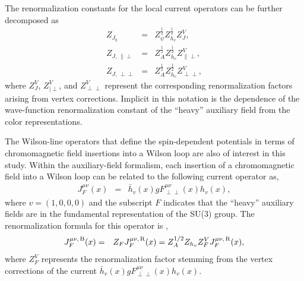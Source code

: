 The renormalization constants for the local current operators can be further decomposed as
\begin{eqnarray}
Z_{J_q} &=& Z_{\psi}^{\frac{1}{2}} Z_{h_v}^{\frac{1}{2}}Z^V_{J},\\
Z_{J,\, \|\perp} &=& Z_{A}^{\frac{1}{2}} Z_{h_v}^{\frac{1}{2}}Z^V_{\|\perp},\\
Z_{J,\, \perp\perp} &= & Z_{A}^{\frac{1}{2}} Z_{h_v}^{\frac{1}{2}}Z^V_{\perp\perp},
\end{eqnarray}
where $Z^V_{J}$, $Z^V_{|\perp}$, and $Z^V_{\perp\perp}$ represent the corresponding renormalization factors arising from vertex corrections. Implicit in this notation is the dependence of the wave-function renormalization constant of the  ``heavy” auxiliary field from the color representations. 

The Wilson-line operators that define the spin-dependent potentials in terms of chromomagnetic field insertions into a Wilson loop \cite{Brambilla:2000gk,Pineda:2000sz} are also of interest in this study. Within the auxiliary-field formalism, each insertion of a chromomagnetic field into a Wilson loop can be related to the following current operator as, 
\begin{eqnarray}
\label{eq:currentoperatorspin}
J^{\mu\nu}_{F}(x) &=&\bar{h}_v(x)gF^{\mu\nu}_{\perp\perp}(x)h_v(x),
\end{eqnarray}
where $v=(1, 0,0,0)$ and the subscript $F$ indicates that the ``heavy” auxiliary fields are in the fundamental representation of the SU($3$)  group. The renormalization formula for this operator is , 
\begin{eqnarray}
J^{\mu\nu,\, \rm B}_{F}(x)&=&Z_{F}J^{\mu\nu,\, \rm R}_{F}(x) = Z_{A}^{1/2} Z_{h_v}Z^V_{F}J^{\mu\nu,\, \rm R}_{F}(x),
\end{eqnarray}
where $Z^V_{F}$ represents the renormalization factor stemming from the vertex corrections of the current $\bar{h}_v(x)gF^{\mu\nu}_{\perp\perp}(x)h_v(x)$.

